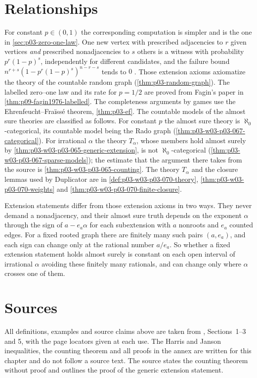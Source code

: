 \section{Relationships}
\label{sec:p03-w03-p03-065-relationships}

For constant \(p\in(0,1)\) the corresponding computation is simpler and is
the one in \cref{sec:p03-zero-one-law}.  One new vertex with prescribed
adjacencies to \(r\) given vertices \emph{and} prescribed nonadjacencies to
\(s\) others is a witness with probability \(p^r(1-p)^s\), independently for
different candidates, and the failure bound
\(n^{r+s}(1-p^r(1-p)^s)^{n-r-s}\) tends to \(0\)
\cite[pp.~12--13]{Spencer2007LogicRandomStructuresAuthor}.  Those extension axioms
axiomatize the theory of the countable random graph
(\cref{thm:p03-random-graph}).  The labelled zero--one law and its rate for
\(p=1/2\) are proved from Fagin's paper in
\cref{thm:p09-fagin1976-labelled}.  The completeness arguments by games use
the Ehrenfeucht--Fra\"iss\'e theorem, \cref{thm:p03-ef}.  The countable
models of the almost sure theories are classified as follows.  For constant
\(p\) the almost sure theory is \(\aleph_0\)-categorical, its countable model
being the Rado graph (\cref{thm:p03-w03-p03-067-categorical}).  For
irrational \(\alpha\) the theory \(T_\alpha\), whose members hold almost
surely by \cref{thm:p03-w03-p03-065-generic-extension}, is not
\(\aleph_0\)-categorical (\cref{thm:p03-w03-p03-067-sparse-models}); the
estimate that the argument there takes from the source is
\cref{thm:p03-w03-p03-065-counting}.  The theory \(T_\alpha\) and the closure
lemmas used by Duplicator are in \cref{def:p03-w03-p03-070-theory},
\cref{thm:p03-w03-p03-070-weights} and
\cref{thm:p03-w03-p03-070-finite-closure}.

Extension statements differ from those extension axioms in two ways.  They
never demand a nonadjacency, and their almost sure truth depends on the
exponent \(\alpha\) through the sign of \(a-e_a\alpha\) for each
subextension with \(a\) nonroots and \(e_a\) counted edges.  For a fixed
rooted graph there are finitely many such pairs \((a,e_a)\), and each sign
can change only at the rational number \(a/e_a\).  So whether a fixed
extension statement holds almost surely is constant on each open interval of
irrational \(\alpha\) avoiding these finitely many rationals, and can change
only where \(\alpha\) crosses one of them.

\section{Sources}
\label{sec:p03-w03-p03-065-sources}

All definitions, examples and source claims above are taken from
\cite{Spencer2007LogicRandomStructuresAuthor}, Sections~1--3 and 5, with the
page locators given at each use.  The Harris and Janson inequalities, the
counting theorem and all proofs in the annex are written for this chapter and
do not follow a source text.  The source states the counting theorem without
proof and outlines the proof of the generic extension statement.
